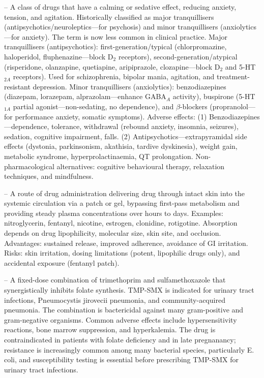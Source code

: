 -- A class of drugs that have a calming or sedative effect, reducing anxiety, tension, and agitation. Historically classified as major tranquillisers (antipsychotics/neuroleptics—for psychosis) and minor tranquillisers (anxiolytics—for anxiety). The term is now less common in clinical practice. Major tranquillisers (antipsychotics): first-generation/typical (chlorpromazine, haloperidol, fluphenazine—block D$_2$ receptors), second-generation/atypical (risperidone, olanzapine, quetiapine, aripiprazole, clozapine—block D$_2$ and 5-HT\(_{2A}\) receptors). Used for schizophrenia, bipolar mania, agitation, and treatment-resistant depression. Minor tranquillisers (anxiolytics): benzodiazepines (diazepam, lorazepam, alprazolam—enhance GABA$_A$ activity), buspirone (5-HT\(_{1A}\) partial agonist—non-sedating, no dependence), and $\beta$-blockers (propranolol—for performance anxiety, somatic symptoms). Adverse effects: (1) Benzodiazepines—dependence, tolerance, withdrawal (rebound anxiety, insomnia, seizures), sedation, cognitive impairment, falls. (2) Antipsychotics—extrapyramidal side effects (dystonia, parkinsonism, akathisia, tardive dyskinesia), weight gain, metabolic syndrome, hyperprolactinaemia, QT prolongation. Non-pharmacological alternatives: cognitive behavioural therapy, relaxation techniques, and mindfulness.

-- A route of drug administration delivering drug through intact skin into the systemic circulation via a patch or gel, bypassing first-pass metabolism and providing steady plasma concentrations over hours to days. Examples: nitroglycerin, fentanyl, nicotine, estrogen, clonidine, rotigotine. Absorption depends on drug lipophilicity, molecular size, skin site, and occlusion. Advantages: sustained release, improved adherence, avoidance of GI irritation. Risks: skin irritation, dosing limitations (potent, lipophilic drugs only), and accidental exposure (fentanyl patch).

-- A fixed-dose combination of trimethoprim and sulfamethoxazole that synergistically inhibits folate synthesis. TMP-SMX is indicated for urinary tract infections, Pneumocystis jirovecii pneumonia, and community-acquired pneumonia. The combination is bactericidal against many gram-positive and gram-negative organisms. Common adverse effects include hypersensitivity reactions, bone marrow suppression, and hyperkalemia. The drug is contraindicated in patients with folate deficiency and in late pregnanancy; resistance is increasingly common among many bacterial species, particularly E. coli, and susceptibility testing is essential before prescribing TMP-SMX for urinary tract infections.

